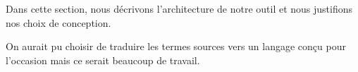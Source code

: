 Dans cette section, nous décrivons l'architecture de notre outil et
nous justifions nos choix de conception.

On aurait pu choisir de traduire les termes sources vers un langage conçu
pour l'occasion mais ce serait beaucoup de travail.
